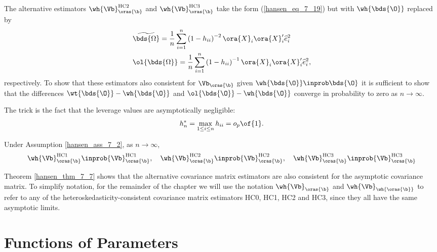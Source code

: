 The alternative estimators $\wh{\Vb}_{\oras{\b}}^{\text{HC2}}$ and $\wh{\Vb}_{\oras{\b}}^{\text{HC3}}$ take the form (\ref{hansen_eq_7_19}) but with $\wh{\bds{\O}}$ replaced by 
\begin{equation}
    \notag
    \begin{aligned}
    &\widetilde{\bds{\Omega}}=\frac{1}{n} \sum_{i=1}^n\left(1-h_{i i}\right)^{-2} \ora{X}_i \ora{X}_i^{\prime} \widehat{e}_i^2\\
    &\ol{\bds{\Omega}}=\frac{1}{n} \sum_{i=1}^n\left(1-h_{i i}\right)^{-1} \ora{X}_i \ora{X}_i^{\prime} \widehat{e}_i^2,
    \end{aligned}
\end{equation}
respectively. To show that these estimators also consistent for $\Vb_{\oras{\b}}$ given $\wh{\bds{\O}} \inprob \bds{\O}$ it is sufficient to show that the differences $\wt{\bds{\O}} - \wh{\bds{\O}}$ and $\ol{\bds{\O}} - \wh{\bds{\O}}$ converge in probability to zero as $n \rightarrow \infty$. 

The trick is the fact that the leverage values are asymptotically negligible:
\begin{equation}
    \label{hansen_eq_7_24}
    h_n^* = \max_{1 \leq i \leq n} h_{ii} = o_p\of{1}.
\end{equation}


\begin{theorem}
    \label{hansen_thm_7_7}
    Under Assumption \ref{hansen_ass_7_2}, as $n \rightarrow \infty$, 
    \begin{equation}
        \notag 
        \wh{\Vb}_{\oras{\b}}^{\text{HC1}} \inprob {\Vb}_{\oras{\b}}^{\text{HC1}}, \quad \wh{\Vb}_{\oras{\b}}^{\text{HC2}} \inprob {\Vb}_{\oras{\b}}^{\text{HC2}}, \quad \wh{\Vb}_{\oras{\b}}^{\text{HC3}} \inprob {\Vb}_{\oras{\b}}^{\text{HC3}}
    \end{equation}
\end{theorem}

Theorem \ref{hansen_thm_7_7} shows that the alternative covariance matrix estimators are also consistent for the asymptotic covariance matrix. To simplify notation, for the remainder of the chapter we will use the notation $\wh{\Vb}_{\oras{\b}}$ and $\wh{\Vb}_{\wh{\oras{\b}}}$ to refer to any of the heteroskedasticity-consistent covariance matrix estimators HC0, HC1, HC2 and HC3, since they all have the same asymptotic limits.


\section{Functions of Parameters}

